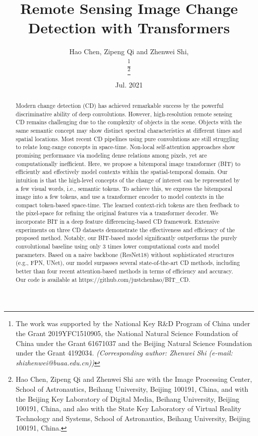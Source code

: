 \documentclass[journal]{IEEEtran}
\begin{document}
\title{Remote Sensing Image Change Detection with Transformers}


\author{Hao Chen, Zipeng Qi and Zhenwei Shi,  

\thanks{
The work was supported by the National Key R\&D Program of China under the Grant 2019YFC1510905, the National Natural Science Foundation of China under the Grant 61671037 and the Beijing Natural Science Foundation under the Grant 4192034.
\emph{(Corresponding author: Zhenwei Shi (e-mail: shizhenwei@buaa.edu.cn))}}

\thanks{Hao Chen, Zipeng Qi and Zhenwei Shi are with the Image Processing Center, School of Astronautics, Beihang University, Beijing 100191, China, and with the Beijing Key Laboratory of Digital Media, Beihang University, Beijing 100191, China, and also with the State Key Laboratory of Virtual Reality Technology and Systems, School of Astronautics, Beihang University, Beijing 100191, China.}

}
\date{Jul. 2021}

\maketitle
\begin{abstract}
Modern change detection (CD) has achieved remarkable success by the powerful discriminative ability of deep convolutions. However, high-resolution remote sensing CD remains challenging due to the complexity of objects in the scene. Objects with the same semantic concept may show distinct spectral characteristics at different times and spatial locations. Most recent CD pipelines using pure convolutions are still struggling to relate long-range concepts in space-time. Non-local self-attention approaches show promising performance via modeling dense relations among pixels, yet are computationally inefficient. Here, we propose a bitemporal image transformer (BIT) to efficiently and effectively model contexts within the spatial-temporal domain. Our intuition is that the high-level concepts of the change of interest can be represented by a few visual words, i.e., semantic tokens. To achieve this, we express the bitemporal image into a few tokens, and use a transformer encoder to model contexts in the compact token-based space-time. The learned context-rich tokens are then feedback to the pixel-space for refining the original features via a transformer decoder. We incorporate BIT in a deep feature differencing-based CD framework. Extensive experiments on three CD datasets demonstrate the effectiveness and efficiency of the proposed method. Notably, our BIT-based model significantly outperforms the purely convolutional baseline using only 3 times lower computational costs and model parameters. Based on a naive backbone (ResNet18) without sophisticated structures (e.g., FPN, UNet), our model surpasses several state-of-the-art CD methods, including better than four recent attention-based methods in terms of efficiency and accuracy. Our code is available at https://github.com/justchenhao/BIT\_CD.
\end{abstract}
\end{document}
